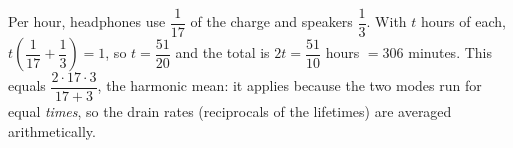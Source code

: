Per hour, headphones use $\dfrac1{17}$ of the charge and speakers $\dfrac13$. With $t$ hours of each, $t\left(\dfrac1{17}+\dfrac13\right)=1$, so $t=\dfrac{51}{20}$ and the total is $2t=\dfrac{51}{10}$ hours $=\boxed{306}$ minutes. This equals $\dfrac{2\cdot17\cdot3}{17+3}$, the harmonic mean: it applies because the two modes run for equal \emph{times}, so the drain rates (reciprocals of the lifetimes) are averaged arithmetically.
